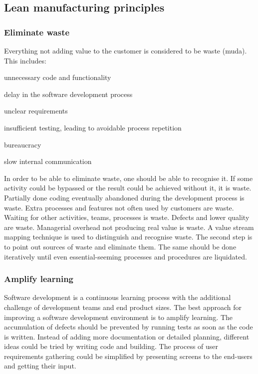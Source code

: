 \subsection{Lean manufacturing principles}

\subsubsection{Eliminate waste}
Everything not adding value to the customer is considered to be waste (muda). This includes:
\begin{compactenum}
\item unnecessary code and functionality
\item delay in the software development process
\item unclear requirements
\item insufficient testing, leading to avoidable process repetition
\item bureaucracy
\item slow internal communication
\end{compactenum}

In order to be able to eliminate waste, one should be able to recognise it. If some activity could be bypassed or the result could be achieved without it, it is waste. Partially done coding eventually abandoned during the development process is waste. Extra processes and features not often used by customers are waste. Waiting for other activities, teams, processes is waste. Defects and lower quality are waste. Managerial overhead not producing real value is waste. A value stream mapping technique is used to distinguish and recognise waste. The second step is to point out sources of waste and eliminate them. The same should be done iteratively until even essential-seeming processes and procedures are liquidated.

\subsubsection{Amplify learning}

Software development is a continuous learning process with the additional challenge of development teams and end product sizes. The best approach for improving a software development environment is to amplify learning. The accumulation of defects should be prevented by running tests as soon as the code is written. Instead of adding more documentation or detailed planning, different ideas could be tried by writing code and building. The process of user requirements gathering could be simplified by presenting screens to the end-users and getting their input.

